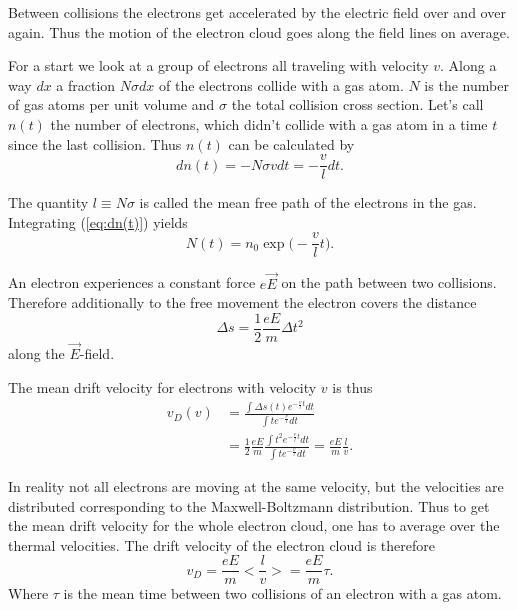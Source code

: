 \documentclass[12pt]{article}
\begin{document}
Between collisions the electrons get accelerated by the electric field over and over again. Thus the motion of the electron cloud goes along the field lines on average. 

For a start we look at a group of electrons all traveling with velocity $v$. Along a way $dx$ a fraction $N \sigma dx$ of the electrons collide with a gas atom. $N$ is the number of gas atoms per unit volume and $\sigma$ the total collision cross section. Let's call $n(t)$ the number of electrons, which didn't collide with a gas atom in a time $t$ since the last collision. Thus $n(t)$ can be calculated by
\begin{equation}
dn(t) = - N \sigma v dt = -\frac{v}{l} dt.
\label{eq:dn(t)}
\end{equation}

The quantity $l \equiv N \sigma$ is called the mean free path of the electrons in the gas. Integrating (\ref{eq:dn(t)}) yields
\begin{equation}
N(t) = n_0 \exp\Big(-\frac{v}{l} t \Big).
\end{equation}

An electron experiences a constant force $e \vec{E}$ on the path between two collisions. Therefore additionally to the free movement the electron covers  the distance 
\begin{equation}
\Delta s = \frac{1}{2} \frac{eE}{m} \Delta t^2
\end{equation}
along the $\vec{E}$-field.

The mean drift velocity for electrons with velocity $v$ is thus
\begin{align*}
 v_D(v) & = \frac{\int \Delta s(t) e^{-\frac{v}{l} t}dt}{\int t e^{-\frac{v}{l}}dt} \\
 & = \frac{1}{2}\frac{eE}{m} \frac{\int t^2 e^{-\frac{v}{l} t}dt}{\int t e^{-\frac{v}{l}}dt} = \frac{eE}{m} \frac{l}{v}.
\end{align*}

In reality not all electrons are moving at the same velocity, but the velocities are distributed corresponding to the Maxwell-Boltzmann distribution. Thus to get the mean drift velocity for the whole electron cloud, one has to average over the thermal velocities. The drift velocity of the electron cloud is therefore
\begin{equation}
v_D = \frac{eE}{m} < \frac{l}{v} > = \frac{eE}{m} \tau.
\end{equation}
Where $\tau$ is the mean time between two collisions of an electron with a gas atom.
\end{document}
